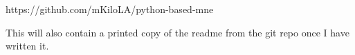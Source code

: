 https://github.com/mKiloLA/python-based-mne

This will also contain a printed copy of the readme from the git repo
once I have written it. 